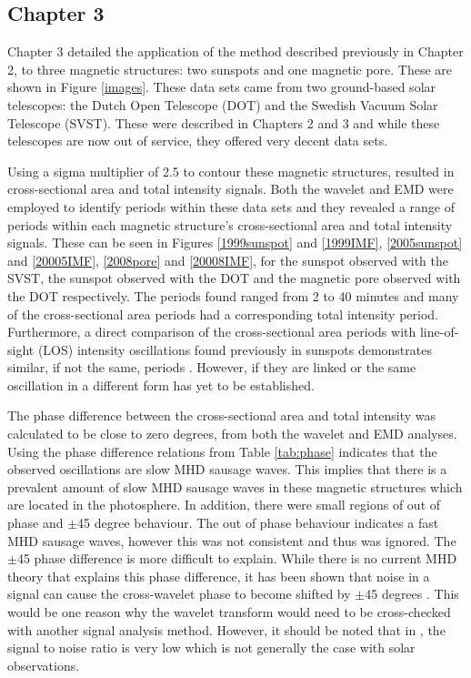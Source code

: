    	\subsection{Chapter 3}
    	
    Chapter 3 detailed the application of the method described previously in Chapter 2, to three magnetic structures: two sunspots and one magnetic pore.
    These are shown in Figure \ref{images}.
    These data sets came from two ground-based solar telescopes: the Dutch Open Telescope (DOT) and the Swedish Vacuum Solar Telescope (SVST). 
    These were described in Chapters 2 and 3 and while these telescopes are now out of service, they offered very decent data sets.
    
    Using a sigma multiplier of 2.5 to contour these magnetic structures, resulted in cross-sectional area and total intensity signals.
    Both the wavelet and EMD were employed to identify periods within these data sets and they revealed a range of periods within each magnetic structure's cross-sectional area and total intensity signals.
    These can be seen in Figures \ref{1999sunspot} and \ref{1999IMF}, \ref{2005sunspot} and \ref{20005IMF}, \ref{2008pore} and \ref{20008IMF}, for the sunspot observed with the SVST, the sunspot observed with the DOT and the magnetic pore observed with the DOT respectively.
    The periods found ranged from 2 to 40 minutes and many of the cross-sectional area periods had a corresponding total intensity period.
    Furthermore, a direct comparison of the cross-sectional area periods with line-of-sight (LOS) intensity oscillations found previously in sunspots demonstrates similar, if not the same, periods \cite{kobanov}.
    However, if they are linked or the same oscillation in a different form has yet to be established.
   
    The phase difference between the cross-sectional area and total intensity was calculated to be close to zero degrees, from both the wavelet and EMD analyses.
    Using the phase difference relations from Table \ref{tab:phase} indicates that the observed oscillations are slow MHD sausage waves. 
    This implies that there is a prevalent amount of slow MHD sausage waves in these magnetic structures which are located in the photosphere.
    In addition, there were small regions of out of phase and $\pm$45 degree behaviour.
    The out of phase behaviour indicates a fast MHD sausage waves, however this was not consistent and thus was ignored. 
    The $\pm$45 phase difference is more difficult to explain.
    While there is no current MHD theory that explains this phase difference, it has been shown that noise in a signal can cause the cross-wavelet phase to become shifted by $\pm$45 degrees \citep{2015A&A...579A..73M}.
    This would be one reason why the wavelet transform would need to be cross-checked with another signal analysis method.
    However, it should be noted that in \cite{2015A&A...579A..73M}, the signal to noise ratio is very low which is not generally the case with solar observations. 
    
